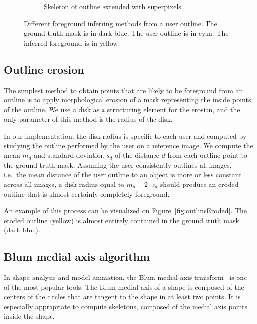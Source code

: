 \begin{figure}[h!]
\begin{subfigure}[b]{0.49\columnwidth}
    \caption{Skeleton of outline extended with superpixels}%
    \label{fig:outlineSkelSP}
\end{subfigure}
\caption{Different foreground inferring methods from a user outline.
The ground truth mask is in dark blue.
The user outline is in cyan.
The inferred foreground is in yellow.}%
\label{fig:foreground}
\end{figure}


\subsection{Outline erosion}%
\label{sec:erosion}


The simplest method to obtain points that are likely to be foreground
from an outline is to apply morphological erosion
of a mask representing the inside points of the outline.
We use a disk as a structuring element for the erosion,
and the only parameter of this method is the radius of the disk.


In our implementation, the disk radius is specific to each user
and computed by studying the outline performed by the user
on a reference image.
We compute the mean $m_d$ and standard deviation $s_d$ of
the distance $d$ from each outline point to the ground truth mask.
Assuming the user consistently outlines all images,
i.e.\ the mean distance of the user outline to an object
is more or less constant across all images,
a disk radius equal to $m_d + 2 \cdot s_d$ should produce an
eroded outline that is almost certainly completely foreground.


An example of this process can be visualized
on Figure~\ref{fig:outlineEroded}.
The eroded outline (yellow) is almost entirely contained
in the ground truth mask (dark blue).


\subsection{Blum medial axis algorithm}


In shape analysis and model animation, the Blum medial axis
transform~\cite{blum1978shape} is one of the most popular tools.
The Blum medial axis of a shape is composed of the centers
of the circles that are tangent to the shape in at least two points.
It is especially appropriate to compute skeletons,
composed of the medial axis points inside the shape.


